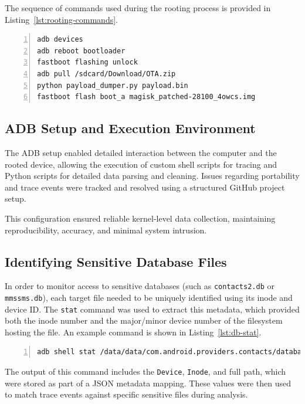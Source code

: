 \documentclass[a4paper,12pt]{report}
\begin{document}
The sequence of commands used during the rooting process is provided in Listing~\ref{lst:rooting-commands}.

\begin{lstlisting}[caption={Command Sequence for Rooting Procedure},label={lst:rooting-commands},numbers=left]
adb devices
adb reboot bootloader
fastboot flashing unlock
adb pull /sdcard/Download/OTA.zip
python payload_dumper.py payload.bin
fastboot flash boot_a magisk_patched-28100_4owcs.img
\end{lstlisting}

\subsection{ADB Setup and Execution Environment}

The ADB setup enabled detailed interaction between the computer and the rooted device, allowing the execution of custom shell scripts for tracing and Python scripts for detailed data parsing and cleaning. Issues regarding portability and trace events were tracked and resolved using a structured GitHub project setup.

This configuration ensured reliable kernel-level data collection, maintaining reproducibility, accuracy, and minimal system intrusion.

\subsection{Identifying Sensitive Database Files}

In order to monitor access to sensitive databases (such as \texttt{contacts2.db} or \texttt{mmssms.db}), each target file needed to be uniquely identified using its inode and device ID. The \texttt{stat} command was used to extract this metadata, which provided both the inode number and the major/minor device number of the filesystem hosting the file. An example command is shown in Listing~\ref{lst:db-stat}.

\begin{lstlisting}[language=sh,caption={Retrieving inode and device ID for a database file},label={lst:db-stat},numbers=left]
adb shell stat /data/data/com.android.providers.contacts/databases/contacts2.db
\end{lstlisting}

The output of this command includes the \texttt{Device}, \texttt{Inode}, and full path, which were stored as part of a JSON metadata mapping. These values were then used to match trace events against specific sensitive files during analysis.
\end{document}
